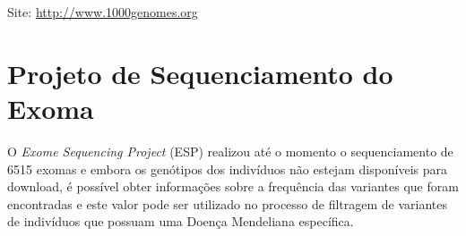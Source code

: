 Site: \url{http://www.1000genomes.org}




\section{Projeto de Sequenciamento do Exoma}

O \textit{Exome Sequencing Project} (ESP) \cite{Fu2013} realizou até o momento o sequenciamento de 6515 exomas e embora os genótipos dos indivíduos não estejam disponíveis para download, é possível obter informações sobre a frequência das variantes que foram encontradas e este valor pode ser utilizado no processo de filtragem de variantes de indivíduos que possuam uma Doença Mendeliana específica.

